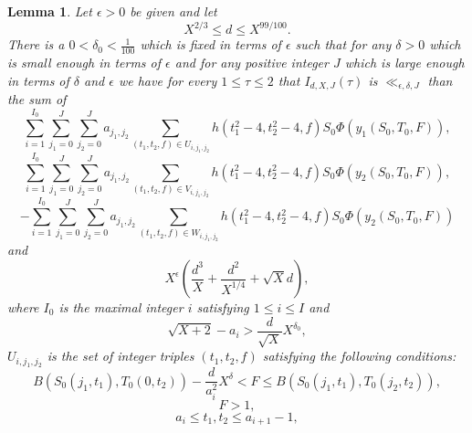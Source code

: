 \documentclass[12pt]{amsart}
\newtheorem{lemma}[theorem]{Lemma}
\theoremstyle{definition}
\numberwithin{equation}{section}
\begin{document}
\begin{lemma}\label{lem:2} Let $\epsilon >0$ be given and let
\begin{equation}X^{2/3}\le d\le X^{99/100}.\label{6,2}\end{equation}
There is a $0<\delta_0<\frac 1{100}$ which is fixed in terms of $
\epsilon$ such that for any
$\delta >0$ which is small enough in terms of $\epsilon$ and for any
positive integer $J$  which is large enough in terms of $\delta$
and $\epsilon$ we have for every $1\le\tau\le 2$ that $I_{d,X,J}\left
(\tau\right)$ is $\ll_{\epsilon ,\delta ,J}$ than the sum of
\begin{equation}\sum_{i=1}^{I_0}\sum_{j_1=0}^J\sum_{j_2=0}^Ja_{j_
1,j_2}\sum_{\left(t_1,t_2,f\right)\in U_{i,j_1,j_2}}h\left(t_1^2-
4,t_2^2-4,f\right)S_0\Phi\left(y_1\left(S_0,T_0,F\right)\right),\label{6,3}\end{equation}
\begin{equation}\sum_{i=1}^{I_0}\sum_{j_1=0}^J\sum_{j_2=0}^Ja_{j_
1,j_2}\sum_{\left(t_1,t_2,f\right)\in V_{i,j_1,j_2}}h\left(t_1^2-
4,t_2^2-4,f\right)S_0\Phi\left(y_2\left(S_0,T_0,F\right)\right),\label{6,4}\end{equation}
\begin{equation}-\sum_{i=1}^{I_0}\sum_{j_1=0}^J\sum_{j_2=0}^Ja_{j_
1,j_2}\sum_{\left(t_1,t_2,f\right)\in W_{i,j_1,j_2}}h\left(t_1^2-
4,t_2^2-4,f\right)S_0\Phi\left(y_2\left(S_0,T_0,F\right)\right)\label{6,5}\end{equation}
and
\begin{equation}X^{\epsilon}\left(\frac {d^3}X+\frac {d^2}{X^{1/4}}
+\sqrt {X}d\right),\label{7}\end{equation}
where $I_0$ is the maximal integer $i$ satisfying $1\le i\le I$
and
\begin{equation}\sqrt {X+2}-a_i>\frac d{\sqrt {X}}X^{\delta_0},\label{10}\end{equation}
$U_{i,j_1,j_2}$ is the set of integer triples $\left(t_1,t_2,f\right
)$ satisfying the following
conditions:
\begin{equation}B\left(S_0\left(j_1,t_1\right),T_0\left(0,t_2\right
)\right)-\frac d{a_i^2}X^{\delta}<F\le B\left(S_0\left(j_1,t_1\right
),T_0\left(j_2,t_2\right)\right),\label{7,9}\end{equation}
\begin{equation}F>1,\label{8}\end{equation}
\begin{equation}a_i\le t_1,t_2\le a_{i+1}-1,\label{9}\end{equation}

\end{lemma}
\end{document}
